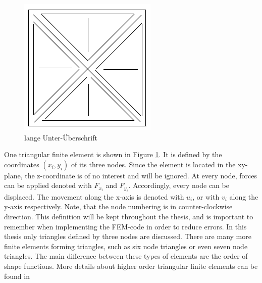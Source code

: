   \begin{figure}
  	\centering
  	\includegraphics[width=0.7\linewidth]{figures/platzhalter}
  	\caption[kurze Unter-Überschrift]{lange Unter-Überschrift}
  	\label{fig:platzhalter}
  \end{figure}
  One triangular finite element is shown in Figure \ref{fig:platzhalter}. It is defined by the coordinates $(x_i,y_i)$ of its three nodes. Since the element is located in the xy-plane, the z-coordinate is of no interest and will be ignored. At every node, forces can be applied denoted with $F_{x_i}$ and $F_{y_i}$. Accordingly, every node can be displaced. The movement along the x-axis is denoted with $u_i$, or with $v_i$ along the y-axis respectively. Note, that the node numbering is in counter-clockwise direction. This definition will be kept throughout the thesis, and is important to remember when implementing the FEM-code in order to reduce errors.
  In this thesis only triangles defined by three nodes are discussed. There are many more finite elements forming triangles, such as six node triangles or even seven node triangles. The main difference between these types of elements are the order of shape functions. More details about higher order triangular finite elements can be found in %
  
